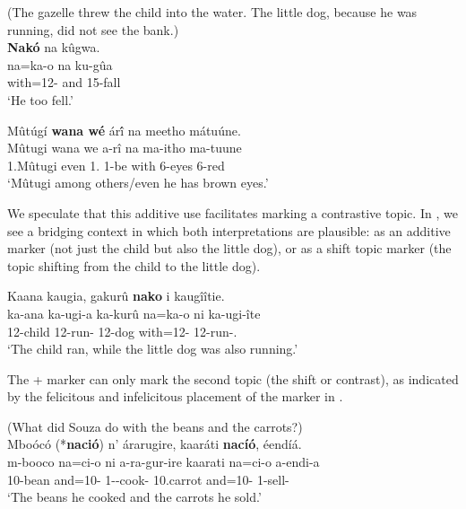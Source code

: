 \documentclass[output=paper]{langscibook}
\begin{document}
\z

\ea
\label{bkm:Ref94510233}
(The gazelle threw the child into the water. The little dog, because he was running, did not see the bank.) \\
\textbf{Nakó} na kûgwa.\\
\gll
na=ka-o  na  ku-gûa\\
with=12-\PRO{} and  15-fall\\
\glt
‘He too fell.’

\z

\ea
\label{bkm:Ref94510132}
Mûtúgí \textbf{wana wé} ár\'{î} na meetho mátuúne.\\
\gll
Mûtugi  wana  we  a-rî  na  ma-itho  ma-tuune\\
1.Mûtugi  even  1.\PRO{} 1\SM{}-be  with  6-eyes  6-red\\
\glt
‘Mûtugi among others/even he has brown eyes.’

\z


We speculate that this additive use facilitates marking a contrastive topic. In , we see a bridging context in which both interpretations are plausible: as an additive marker (not just the child but also the little dog), or as a shift topic marker (the topic shifting from the child to the little dog).

\ea
\label{bkm:Ref94510724}
Kaana kaugia, gakurû \textbf{nako} i kaugîîtie.\\
\gll
ka-ana  ka-ugi-a  ka-kurû  na=ka-o  ni  ka-ugi-îte\\
12-child  12\SM{}-run-\FV{} 12-dog  with=12-\PRO{} \FOC{} 12\SM{}-run-\STAT.\PFV{}\\
\glt
‘The child ran, while the little dog was also running.’

\z


The \NA+{} \PRO{} marker can only mark the second topic (the shift or contrast), as indicated by the felicitous and infelicitous placement of the marker in .

\ea
\label{bkm:Ref94510956}
(What did Souza do with the beans and the carrots?)\\
Mboócó (*\textbf{nació}) n’ árarugire, kaaráti \textbf{nacíó}, éendíá.\\
\gll
m-booco  na=ci-o  ni  a-ra-gur-ire  kaarati  na=ci-o  a-endi-a\\
10-bean  and=10-\PRO{}  \FOC{} 1\SM{}-\YPST{}-cook-\PFV{} 10.carrot  and=10-\PRO{}  1\SM{}-sell-\FV{}\\
\glt
‘The beans he cooked and the carrots he sold.’
\end{document}
